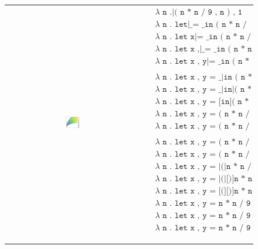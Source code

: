\begin{figure}
  \begin{tabular}{cp{}}
  \includegraphics[width=0.1\textwidth]{img/circles-parabola-grow-1.png}
  &
  {
    \begin{align*}
      & \texttt{$\lambda$ n .|( n * n / 9 , n ) , 1} \\
      & \texttt{$\lambda$ n . let|\_ = \_ in ( n * n / 9 , n ) , 1} \\
      & \texttt{$\lambda$ n . let x|= \_ in ( n * n / 9 , n ) , 1} \\
      & \texttt{$\lambda$ n . let x ,|\_ = \_ in ( n * n / 9 , n ) , 1} \\
      & \texttt{$\lambda$ n . let x , y|= \_ in ( n * n / 9 , n ) , 1} \\\\
      & \texttt{$\lambda$ n . let x , y = \_|in ( n * n / 9 , n ) , 1} \\
      & \texttt{$\lambda$ n . let x , y = \_|in|( n * n / 9 , n ) , 1} \\
      & \texttt{$\lambda$ n . let x , y = [in]( n * n / 9 , n ) , 1} \\
      & \texttt{$\lambda$ n . let x , y = ( n * n / 9 , n )[in], 1} \\
      & \texttt{$\lambda$ n . let x , y = ( n * n / 9 , n )|in \_ , 1} \\\\
      & \texttt{$\lambda$ n . let x , y = ( n * n / 9 , n|) in x , y , 1 } \\
      & \texttt{$\lambda$ n . let x , y = ( n * n / 9 , n|)|in x , y , 1 } \\
      & \texttt{$\lambda$ n . let x , y = |(|n * n / 9 , n[)]in x , y , 1 } \\
      & \texttt{$\lambda$ n . let x , y = |(|[)]n * n / 9 , n in x , y , 1 } \\
      & \texttt{$\lambda$ n . let x , y = [(][)]n * n / 9 , n in x , y , 1 } \\
      & \texttt{$\lambda$ n . let x , y = n * n / 9 , n in [(][)]x , y , 1 } \\
      & \texttt{$\lambda$ n . let x , y = n * n / 9 , n in ( x , y[)], 1 } \\
      & \texttt{$\lambda$ n . let x , y = n * n / 9 , n in ( x , y|) , 1 } \\\\

\end{align*}}
\end{tabular}
\end{figure}
